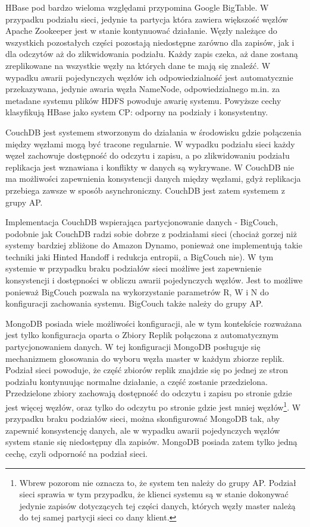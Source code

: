 HBase pod bardzo wieloma względami przypomina Google BigTable.
W przypadku podziału sieci, jedynie ta partycja która zawiera większość węzłów Apache Zookeeper jest w stanie kontynuować działanie.
Węzły należące do wszystkich pozostałych części pozostają niedostępne zarówno dla zapisów, jak i dla odczytów aż do zlikwidowania podziału.
Każdy zapis czeka, aż dane zostaną zreplikowane na wszystkie węzły na których dane te mają się znaleźć.
W wypadku awarii pojedynczych węzłów ich odpowiedzialność jest automatycznie przekazywana, jedynie awaria węzła NameNode, odpowiedzialnego m.in. za metadane systemu plików HDFS powoduje awarię systemu.
Powyższe cechy klasyfikują HBase jako system CP: odporny na podziały i konsystentny.

CouchDB jest systemem stworzonym do działania w środowisku gdzie połączenia między węzłami mogą być tracone regularnie.
W wypadku podziału sieci każdy węzeł zachowuje dostępność do odczytu i zapisu, a po zlikwidowaniu podziału replikacja jest wznawiana i konflikty w danych są wykrywane.
W CouchDB nie ma możliwości zapewnienia konsystencji danych między węzłami, gdyż replikacja przebiega zawsze w sposób asynchroniczny.
CouchDB jest zatem systemem z grupy AP.

Implementacja CouchDB wspierająca partycjonowanie danych - BigCouch, podobnie jak CouchDB radzi sobie dobrze z podziałami sieci (chociaż gorzej niż systemy bardziej zbliżone do Amazon Dynamo, ponieważ one implementują takie techniki jaki Hinted Handoff i redukcja entropii, a BigCouch nie).
W tym systemie w przypadku braku podziałów sieci możliwe jest zapewnienie konsystencji i dostępności w obliczu awarii pojedynczych węzłów.
Jest to możliwe ponieważ BigCouch pozwala na wykorzystanie parametrów R, W i N do konfiguracji zachowania systemu.
BigCouch także należy do grupy AP.

MongoDB posiada wiele możliwości konfiguracji, ale w tym kontekście rozważana jest tylko konfiguracja oparta o Zbiory Replik połączona z automatycznym partycjonowaniem danych.
W tej konfiguracji MongoDB posługuje się mechanizmem głosowania do wyboru węzła master w każdym zbiorze replik.
Podział sieci powoduje, że część zbiorów replik znajdzie się po jednej ze stron podziału kontynuując normalne działanie, a część zostanie przedzielona.
Przedzielone zbiory zachowają dostępność do odczytu i zapisu po stronie gdzie jest więcej węzłów, oraz tylko do odczytu po stronie gdzie jest mniej węzłów\footnote{Wbrew pozorom nie oznacza to, że system ten należy do grupy AP. Podział sieci sprawia w tym przypadku, że klienci systemu są w stanie dokonywać jedynie zapisów dotyczących tej części danych, których węzły master należą do tej samej partycji sieci co dany klient.}.
W przypadku braku podziałów sieci, można skonfigurować MongoDB tak, aby zapewnić konsystencję danych, ale w wypadku awarii pojedynczych węzłów system stanie się niedostępny dla zapisów.
MongoDB posiada zatem tylko jedną cechę, czyli odporność na podział sieci.

